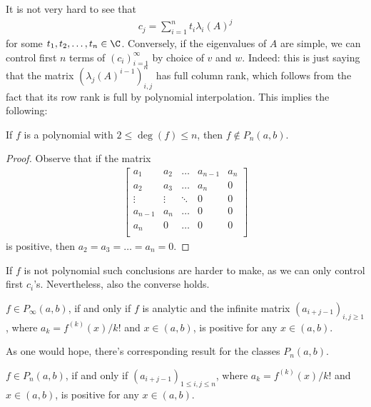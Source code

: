 It is not very hard to see that
\begin{align*}
c_{j} = \sum_{i = 1}^{n} t_{i} \lambda_{i}(A)^{j}
\end{align*}
for some $t_{1}, t_{2}, \ldots, t_{n} \in \C$. Conversely, if the eigenvalues of $A$ are simple, we can control first $n$ terms of $(c_{i})_{i = 1}^{\infty}$ by choice of $v$ and $w$. Indeed: this is just saying that the matrix $(\lambda_{j}(A)^{i - 1})_{i, j}^{n}$ has full column rank, which follows from the fact that its row rank is full by polynomial interpolation. This implies the following:

\begin{prop}
	If $f$ is a polynomial with $2 \leq \deg(f) \leq n$, then $f \notin P_{n}(a, b)$.
\end{prop}
\begin{proof}
	Observe that if the matrix
	\begin{align*}
		\begin{bmatrix}
			a_{1} & a_{2} & \ldots & a_{n - 1} & a_{n} \\
			a_{2} & a_{3} & \ldots & a_{n} & 0 \\
			\vdots & \vdots & \ddots & 0 & 0 \\
			a_{n - 1} & a_{n} & \ldots & 0 & 0 \\
			a_{n} & 0 & \ldots & 0 & 0 \\
		\end{bmatrix}
	\end{align*}
	is positive, then $a_{2} = a_{3} = \ldots = a_{n} = 0$.
\end{proof}

If $f$ is not polynomial such conclusions are harder to make, as we can only control first $c_{i}$'s. Nevertheless, also the converse holds.

\begin{lause}\label{heuristic_loewner}
	$f \in P_{\infty}(a, b)$, if and only if $f$ is analytic and the infinite matrix $(a_{i + j - 1})_{i, j \geq 1}$, where $a_{k} = f^{(k)}(x)/k!$ and $x \in (a, b)$, is positive for any $x \in (a, b)$.
\end{lause}

As one would hope, there's corresponding result for the classes $P_{n}(a, b)$.

\begin{lause}\label{heuristic_main}
	$f \in P_{n}(a, b)$, if and only if $(a_{i + j - 1})_{1 \leq i, j \leq n}$, where $a_{k} = f^{(k)}(x)/k!$ and $x \in (a, b)$, is positive for any $x \in (a, b)$.
\end{lause}

